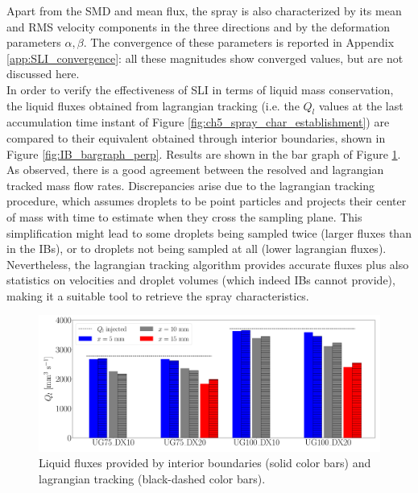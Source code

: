 Apart from the SMD and mean flux, the spray is also characterized by its mean and RMS velocity components in the three directions and by the deformation parameters $\alpha, \beta$. The convergence of these parameters is reported in Appendix \ref{app:SLI_convergence}: all these magnitudes show converged values, but are not discussed here. \\



 In order to verify the effectiveness of SLI in terms of liquid mass conservation, the liquid fluxes obtained from lagrangian tracking (i.e. the $Q_l$ values at the last accumulation time instant of Figure \ref{fig:ch5_spray_char_establishment}) are compared to their equivalent obtained through interior boundaries, shown in Figure \ref{fig:IB_bargraph_perp}. Results are shown in the bar graph of Figure \ref{fig:fluxes_bargraph_IBs_vs_LGS}. As observed, there is a good agreement between the resolved and lagrangian tracked mass flow rates. Discrepancies arise due to the lagrangian tracking procedure, which assumes droplets to be point particles and projects their center of mass with time to estimate when they cross the sampling plane. This simplification might lead to some droplets being sampled twice (larger fluxes than in the IBs), or to droplets not being sampled at all (lower lagrangian fluxes). Nevertheless, the lagrangian tracking algorithm provides accurate fluxes plus also statistics on velocities and droplet volumes (which indeed IBs cannot provide), making it a suitable tool to retrieve the spray characteristics.  



\begin{figure}[ht]
	\centering
   \includegraphics[scale=0.20]{./part2_developments/figures_ch5_resolved_JICF/SPRAY_characterization/establishment_and_fluxes/fluxes_SLI_vs_IBs}
   \caption{Liquid fluxes provided by interior boundaries (solid color bars) and lagrangian tracking (black-dashed color bars).}
   \label{fig:fluxes_bargraph_IBs_vs_LGS}
\end{figure}


